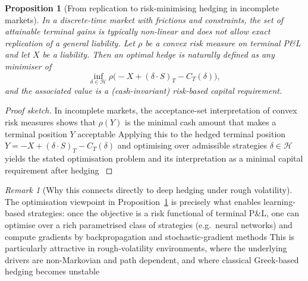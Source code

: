 \documentclass[12pt,a4paper]{article}
\theoremstyle{definition}
\theoremstyle{plain}
\newtheorem{proposition}{Proposition}[section]
\theoremstyle{remark}
\newtheorem{remark}{Remark}[section]
\theoremstyle{plain}
\begin{document}
\begin{proposition}[From replication to risk-minimising hedging in incomplete markets]
\label{prop:replication_to_risk_min}
In a discrete-time market with frictions and constraints, the set of attainable terminal gains is typically non-linear and does not allow exact replication of a general liability.
Let $\rho$ be a convex risk measure on terminal P\&L and let $X$ be a liability.
Then an optimal hedge is naturally defined as any minimiser of
\[
\inf_{\delta\in\mathcal H}\rho\bigl(-X + (\delta\cdot S)_T - C_T(\delta)\bigr),
\]
and the associated value is a (cash-invariant) risk-based capital requirement. 
\end{proposition}

\begin{proof}[Proof sketch]
In incomplete markets, the acceptance-set interpretation of convex risk measures shows that $\rho(Y)$ is the minimal cash amount that makes a terminal position $Y$ acceptable \cite{FoellmerSchied2016}
Applying this to the hedged terminal position $Y=-X+(\delta\cdot S)_T-C_T(\delta)$ and optimising over admissible strategies $\delta\in\mathcal H$ yields the stated optimisation problem and its interpretation as a minimal capital requirement after hedging \cite{FoellmerSchied2016,Buehler2019DeepHedging}
\end{proof}

\begin{remark}[Why this connects directly to deep hedging under rough volatility]\label{rem:deep_hedging_connection}
The optimisation viewpoint in Proposition~\ref{prop:replication_to_risk_min} is precisely what enables learning-based strategies: once the objective is a risk functional of terminal P\&L, one can optimise over a rich parametrised class of strategies (e.g.\ neural networks) and compute gradients by backpropagation and stochastic-gradient methods \cite{Buehler2019DeepHedging,HighamHigham2019DeepLearning}
This is particularly attractive in rough-volatility environments, where the underlying drivers are non-Markovian and path dependent, and where classical Greek-based hedging becomes unstable \cite{GatheralRough,BayerFriz2016,Horvath2021DeepRough}
\end{remark}
\end{document}
